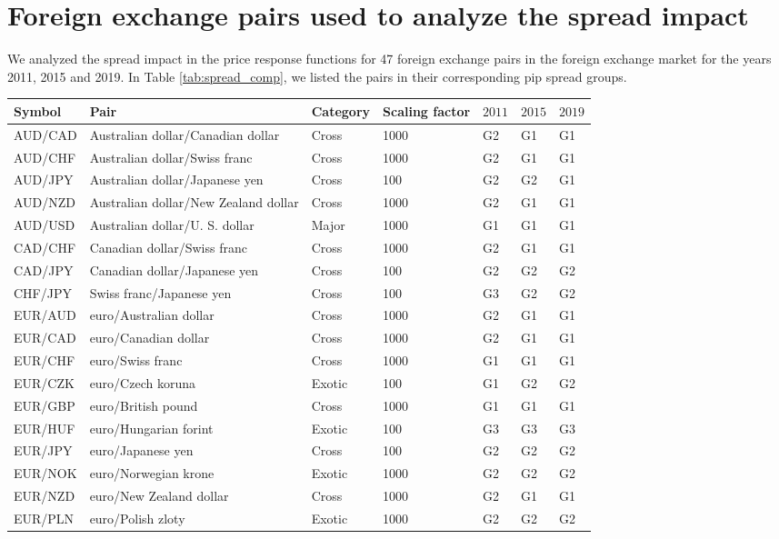 \section{Foreign exchange pairs used to analyze the spread impact}
\label{app:fx_pairs_spread}

We analyzed the spread impact in the price response functions for 47 foreign
exchange pairs in the foreign exchange market for the years 2011, 2015 and
2019. In Table \ref{tab:spread_comp}, we listed the pairs in their corresponding pip spread groups.

\begin{table*}
\begin{center}
\begin{centering}
    \begin{threeparttable}
    \caption{Foreign exchange pairs used in Sect. \ref{sec:spread_impact}.}
    \label{tab:spread_comp}
    \begin{tabular}{lllllll}
    \hline
    Symbol & Pair & Category & Scaling factor & $2011$ & $2015$ & $2019$\tabularnewline
    \hline
    AUD/CAD & Australian dollar/Canadian dollar & Cross & 1000 & G2 & G1 & G1\tabularnewline
    AUD/CHF & Australian dollar/Swiss franc & Cross & 1000 & G2 & G1 & G1\tabularnewline
    AUD/JPY & Australian dollar/Japanese yen & Cross & 100 & G2 & G2 & G1\tabularnewline
    AUD/NZD & Australian dollar/New Zealand dollar & Cross & 1000 & G2 & G1 & G1\tabularnewline
    AUD/USD & Australian dollar/U. S. dollar & Major & 1000 & G1 & G1 & G1\tabularnewline
    CAD/CHF & Canadian dollar/Swiss franc & Cross & 1000 & G2 & G1 & G1\tabularnewline
    CAD/JPY & Canadian dollar/Japanese yen & Cross & 100 & G2 & G2 & G2\tabularnewline
    CHF/JPY & Swiss franc/Japanese yen & Cross & 100 & G3 & G2 & G2\tabularnewline
    EUR/AUD & euro/Australian dollar & Cross & 1000 & G2 & G1 & G1\tabularnewline
    EUR/CAD & euro/Canadian dollar & Cross & 1000 & G2 & G1 & G1\tabularnewline
    EUR/CHF & euro/Swiss franc & Cross & 1000 & G1 & G1 & G1\tabularnewline
    EUR/CZK & euro/Czech koruna & Exotic & 100 & G1 & G2 & G2\tabularnewline
    EUR/GBP & euro/British pound & Cross & 1000 & G1 & G1 & G1\tabularnewline
    EUR/HUF & euro/Hungarian forint & Exotic & 100 & G3 & G3 & G3\tabularnewline
    EUR/JPY & euro/Japanese yen & Cross & 100 & G2 & G2 & G2\tabularnewline
    EUR/NOK & euro/Norwegian krone & Exotic & 1000 & G2 & G2 & G2\tabularnewline
    EUR/NZD & euro/New Zealand dollar & Cross & 1000 & G2 & G1 & G1\tabularnewline
    EUR/PLN & euro/Polish zloty & Exotic & 1000 & G2 & G2 & G2\tabularnewline

\end{tabular}
\end{threeparttable}
\end{centering}
\end{center}
\end{table*}
